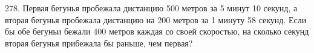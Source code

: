 278. Первая бегунья пробежала дистанцию 500 метров за 5 минут 10 секунд, а вторая бегунья пробежала дистанцию на 200 метров за 1 минуту 58 секунд. Если бы обе бегуньи бежали 400 метров каждая со своей скоростью, на сколько секунд вторая бегунья прибежала бы раньше, чем первая?\\
